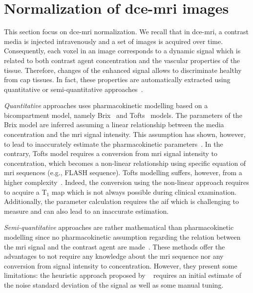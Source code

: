 \section{Normalization of \acs*{dce}-\acs*{mri} images}\label{sec:chp5:DCE-norm}

This section focus on \ac{dce}-\ac{mri} normalization.
We recall that in \ac{dce}-\ac{mri}, a contrast media is injected intravenously and a set of images is acquired over time.
Consequently, each voxel in an image corresponds to a dynamic signal which is related to both contrast agent concentration and the vascular properties of the tissue.
Therefore, changes of the enhanced signal allows to discriminate healthy from \ac{cap} tissues.
In fact, these properties are automatically extracted using quantitative or semi-quantitative approaches~\cite{Lemaitre2015}.

\emph{Quantitative} approaches uses pharmacokinetic modelling based on a bicompartment model, namely Brix~\cite{brix1991pharmacokinetic} and Tofts~\cite{tofts1995quantitative} models.
The parameters of the Brix model are inferred assuming a linear relationship between the media concentration and the \ac{mri} signal intensity.
This assumption has shown, however, to lead to inaccurately estimate the pharmacokinetic parameters~\cite{heilmann2006determination}.
In the contrary, Tofts model requires a conversion from \ac{mri} signal intensity to concentration, which becomes a non-linear relationship using specific equation of \ac{mri} sequences (e.g., FLASH sequence).
Tofts modelling suffers, however, from a higher complexity~\cite{gliozzi2011phenomenological}.
Indeed, the conversion using the non-linear approach requires to acquire a T$_1$ map which is not always possible during clinical examination.
Additionally, the parameter calculation requires the \ac{aif} which is challenging to measure and can also lead to an inaccurate estimation.

\emph{Semi-quantitative} approaches are rather mathematical than pharmacokinetic modelling since no pharmacokinetic assumption regarding the relation between the \ac{mri} signal and the contrast agent are made~\cite{huisman2001accurate,gliozzi2011phenomenological}.
These methods offer the advantages to not require any knowledge about the \ac{mri} sequence nor any conversion from signal intensity to concentration.
However, they present some limitations: the heuristic approach proposed by \citeauthor{huisman2001accurate}~\cite{huisman2001accurate} requires an initial estimate of the noise standard deviation of the signal as well as some manual tuning.

